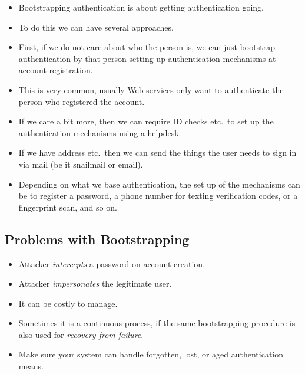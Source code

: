 \documentclass{beamer}
\begin{document}
\begin{frame}{\insertsubsectionhead}
  \begin{itemize}
    \item Bootstrapping authentication is about getting authentication going.

    \item To do this we can have several approaches.

    \item First, if we do not care about who the person is, we can just 
      bootstrap authentication by that person setting up authentication 
      mechanisms at account registration.

    \item This is very common, usually Web services only want to authenticate 
      the person who registered the account.

    \item If we care a bit more, then we can require ID checks etc.\ to set up 
      the authentication mechanisms using a helpdesk.

    \item If we have address etc.\, then we can send the things the user needs 
      to sign in via mail (be it snailmail or email).

    \item Depending on what we base authentication, the set up of the 
      mechanisms can be to register a password, a phone number for texting 
      verification codes, or a fingerprint scan, and so on.
  \end{itemize}
\end{frame}

\subsection{Problems with Bootstrapping}

\begin{frame}{\insertsubsectionhead}
  \begin{itemize}
    \item Attacker \emph{intercepts} a password on account creation.
    \item Attacker \emph{impersonates} the legitimate user.
  \end{itemize}
\end{frame}

\begin{frame}{\insertsubsectionhead}
  \begin{itemize}
    \item It can be costly to manage.

    \item Sometimes it is a continuous process, if the same bootstrapping 
      procedure is also used for \emph{recovery from failure}.

    \item Make sure your system can handle forgotten, lost, or aged 
      authentication means.

  \end{itemize}
\end{frame}
\end{document}
